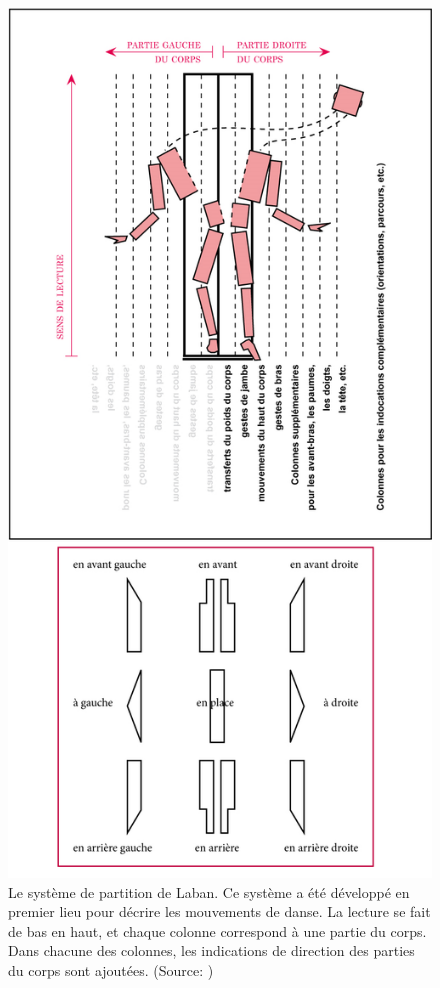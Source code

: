 \begin{figure}
    \centering
    \includegraphics[width=\textwidth]{pictures/laban_partition_et_directions_cinetographie.png}
    \caption[Le système de partition de Laban]{Le système de partition de Laban. Ce système a été développé en premier lieu pour décrire les mouvements de danse. La lecture se fait de bas en haut, et chaque colonne correspond à une partie du corps. Dans chacune des colonnes, les indications de direction des parties du corps sont ajoutées. (Source: \parencite{WikiLaban})}
    \label{fig:laban_partition_et_directions_cinetographie}
\end{figure}

